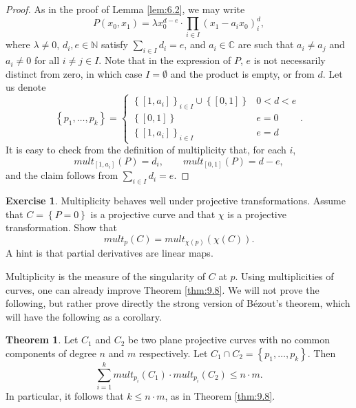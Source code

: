 \documentclass{article}
\newcommand{\N}{\mathbb{N}}
\newcommand{\C}{\mathbb{C}}
\newcommand{\rb}[1]{\left( #1 \right)}
\renewcommand{\sb}[1]{\left[ #1 \right]}
\newcommand{\cb}[1]{\left\{ #1 \right\}}
\theoremstyle{definition}\newtheorem{definition}{Definition}[section]
\theoremstyle{definition}\newtheorem{notation}[definition]{Notation}
\theoremstyle{definition}\newtheorem{remark}[definition]{Remark}
\theoremstyle{definition}\newtheorem{example}[definition]{Example}
\theoremstyle{definition}\newtheorem{fact}{Fact}
\theoremstyle{definition}\newtheorem{exercise}{Exercise}
\newtheorem{theorem}[definition]{Theorem}
\begin{document}
\begin{proof}
As in the proof of Lemma \ref{lem:6.2}, we may write
$$ P\rb{x_0, x_1} = \lambda x_0^{d - e} \cdot \prod_{i \in I} \rb{x_1 - a_ix_0}^d_i, $$
where $ \lambda \ne 0 $, $ d_i, e \in \N $ satisfy $ \sum_{i \in I} d_i = e $, and $ a_i \in \C $ are such that $ a_i \ne a_j $ and $ a_i \ne 0 $ for all $ i \ne j \in I $. Note that in the expression of $ P $, $ e $ is not necessarily distinct from zero, in which case $ I = \emptyset $ and the product is empty, or from $ d $. Let us denote
$$ \cb{p_1, \dots, p_k} = \begin{cases} \cb{\sb{1, a_i}}_{i \in I} \cup \cb{\sb{0, 1}} & 0 < d < e \\ \cb{\sb{0, 1}} & e = 0 \\ \cb{\sb{1, a_i}}_{i \in I} & e = d \end{cases}. $$
It is easy to check from the definition of multiplicity that, for each $ i $,
$$ mult_{\sb{1, a_i}}\rb{P} = d_i, \qquad mult_{\sb{0, 1}}\rb{P} = d - e, $$
and the claim follows from $ \sum_{i \in I} d_i = e $.
\end{proof}

\begin{exercise}
\label{ex:32}
Multiplicity behaves well under projective transformations.
Assume that $ C = \cb{P = 0} $ is a projective curve and that $ \chi $ is a projective transformation. Show that
$$ mult_p\rb{C} = mult_{\chi\rb{p}}\rb{\chi\rb{C}}. $$
A hint is that partial derivatives are linear maps.
\end{exercise}


Multiplicity is the measure of the singularity of $ C $ at $ p $. Using multiplicities of curves, one can already improve Theorem \ref{thm:9.8}. We will not prove the following, but rather prove directly the strong version of Bézout's theorem, which will have the following as a corollary.

\begin{theorem}
\label{thm:11.6}
Let $ C_1 $ and $ C_2 $ be two plane projective curves with no common components of degree $ n $ and $ m $ respectively. Let $ C_1 \cap C_2 = \cb{p_1, \dots, p_k} $. Then
$$ \sum_{i = 1}^k mult_{p_i}\rb{C_1} \cdot mult_{p_i}\rb{C_2} \le n \cdot m. $$
In particular, it follows that $ k \le n \cdot m $, as in Theorem \ref{thm:9.8}.
\end{theorem}
\end{document}
